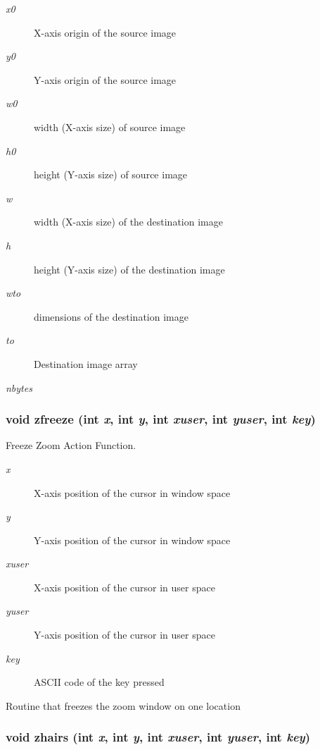 \begin{Desc}
\item[Parameters:]
\begin{description}
\item[{\em x0}]X-axis origin of the source image \item[{\em y0}]Y-axis origin of the source image \item[{\em w0}]width (X-axis size) of source image \item[{\em h0}]height (Y-axis size) of source image \item[{\em w}]width (X-axis size) of the destination image \item[{\em h}]height (Y-axis size) of the destination image \item[{\em wto}]dimensions of the destination image \item[{\em to}]Destination image array \item[{\em nbytes}]\end{description}
\end{Desc}
\subsubsection{\setlength{\rightskip}{0pt plus 5cm}void zfreeze (int {\em x}, int {\em y}, int {\em xuser}, int {\em yuser}, int {\em key})}\label{xtvutils_8c_a216}


Freeze Zoom Action Function. 

\begin{Desc}
\item[Parameters:]
\begin{description}
\item[{\em x}]X-axis position of the cursor in window space \item[{\em y}]Y-axis position of the cursor in window space \item[{\em xuser}]X-axis position of the cursor in user space \item[{\em yuser}]Y-axis position of the cursor in user space \item[{\em key}]ASCII code of the key pressed\end{description}
\end{Desc}
Routine that freezes the zoom window on one location 
\subsubsection{\setlength{\rightskip}{0pt plus 5cm}void zhairs (int {\em x}, int {\em y}, int {\em xuser}, int {\em yuser}, int {\em key})}\label{xtvutils_8c_a220}


